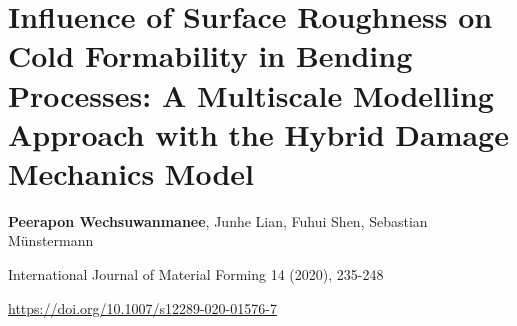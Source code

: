 \chapter[roughness]{Influence of Surface Roughness on Cold Formability in Bending Processes: A Multiscale Modelling Approach with the Hybrid Damage Mechanics Model}\label{ch:roughness}
\begin{center}

    \textbf{Peerapon Wechsuwanmanee}, Junhe Lian, Fuhui Shen, Sebastian Münstermann
    
    \vspace{20pt}
    
    International Journal of Material Forming 14 (2020), 235-248
    
    \vspace{20pt}
    
    \url{https://doi.org/10.1007/s12289-020-01576-7}
    
    \vspace{40pt}
    
\end{center}


